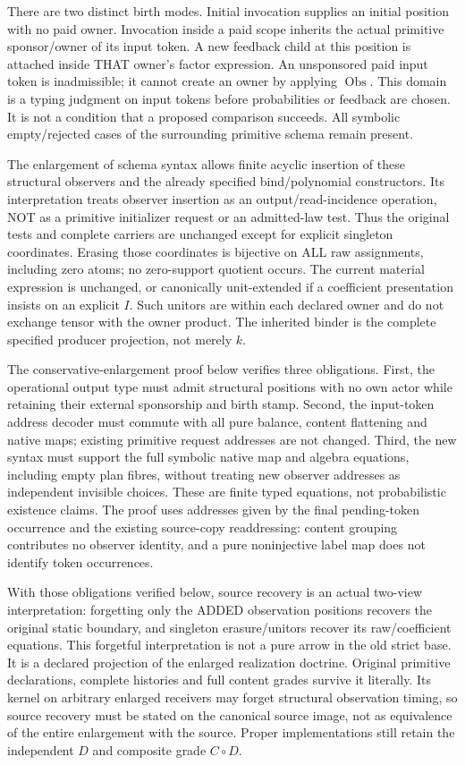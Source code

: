 \documentclass{article}
\begin{document}
There are two distinct birth modes. Initial invocation supplies an initial position with no paid owner. Invocation inside a paid scope inherits the actual primitive sponsor/owner of its input token. A new feedback child at this position is attached inside THAT owner's factor expression. An unsponsored paid input token is inadmissible; it cannot create an owner by applying $\operatorname{Obs}$. This domain is a typing judgment on input tokens before probabilities or feedback are chosen. It is not a condition that a proposed comparison succeeds. All symbolic empty/rejected cases of the surrounding primitive schema remain present.

The enlargement of schema syntax allows finite acyclic insertion of these structural observers and the already specified bind/polynomial constructors. Its interpretation treats observer insertion as an output/read-incidence operation, NOT as a primitive initializer request or an admitted-law test. Thus the original tests and complete carriers are unchanged except for explicit singleton coordinates. Erasing those coordinates is bijective on ALL raw assignments, including zero atoms; no zero-support quotient occurs. The current material expression is unchanged, or canonically unit-extended if a coefficient presentation insists on an explicit $I$. Such unitors are within each declared owner and do not exchange tensor with the owner product. The inherited binder is the complete specified producer projection, not merely $k$.

The conservative-enlargement proof below verifies three obligations. First, the operational output type must admit structural positions with no own actor while retaining their external sponsorship and birth stamp. Second, the input-token address decoder must commute with all pure balance, content flattening and native maps; existing primitive request addresses are not changed. Third, the new syntax must support the full symbolic native map and algebra equations, including empty plan fibres, without treating new observer addresses as independent invisible choices. These are finite typed equations, not probabilistic existence claims. The proof uses addresses given by the final pending-token occurrence and the existing source-copy readdressing: content grouping contributes no observer identity, and a pure noninjective label map does not identify token occurrences.

With those obligations verified below, source recovery is an actual two-view interpretation: forgetting only the ADDED observation positions recovers the original static boundary, and singleton erasure/unitors recover its raw/coefficient equations. This forgetful interpretation is not a pure arrow in the old strict base. It is a declared projection of the enlarged realization doctrine. Original primitive declarations, complete histories and full content grades survive it literally. Its kernel on arbitrary enlarged receivers may forget structural observation timing, so source recovery must be stated on the canonical source image, not as equivalence of the entire enlargement with the source. Proper implementations still retain the independent $D$ and composite grade $C\circ D$.
\end{document}
